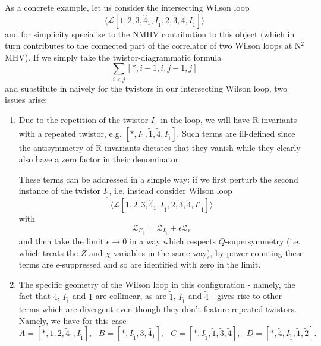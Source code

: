 \documentclass[12pt]{article}
\numberwithin{equation}{section}
\begin{document}
As a concrete example, let us consider the intersecting Wilson loop 
\begin{equation}
\langle \mathcal{L}[1,2,3,\widehat{4}_1,I_{\tilde{1}},\tilde{2},\tilde{3},\tilde{4},I_{\tilde{1}}] \rangle
\end{equation}
and for simplicity specialise to the NMHV contribution to this object (which in turn contributes to the connected part of the correlator of two Wilson loops at N\(^2\)MHV). If we simply take the twistor-diagrammatic formula 
\begin{equation}
\sum_{i<j} [*,i-1,i,j-1,j]
\end{equation}
and substitute in naively for the twistors in our intersecting Wilson loop, two issues arise: 
\begin{enumerate}
\item Due to the repetition of the twistor \(I_{\tilde{1}}\) in the loop, we will have R-invariants with a repeated twistor, e.g. \([*,I_{\tilde{1}},\tilde{1},\tilde{4},I_{\tilde{1}}]\). Such terms are ill-defined since the antisymmetry of R-invariants dictates that they vanish while they clearly also have a zero factor in their denominator.

These terms can be addressed in a simple way: if we first perturb the second instance of the twistor \(I_{\tilde{\jmath}}\), i.e. instead consider Wilson loop
\begin{equation}
\langle \mathcal{L}[1,2,3,\widehat{4}_1,I_{\tilde{1}},\tilde{2},\tilde{3},\tilde{4},I'_{\tilde{1}}] \rangle
\end{equation}
with
\begin{equation}
\mathcal{Z}_{I'_{\tilde{1}}} = \mathcal{Z}_{I_{\tilde{1}}} + \epsilon \mathcal{Z}_r
\end{equation}
and then take the limit \(\epsilon \to 0\) in a way which respects \(Q\)-supersymmetry (i.e. which treats the \(Z\) and \(\chi\) variables in the same way), by power-counting these terms are \(\epsilon\)-suppressed and so are identified with zero in the limit. 

\item The specific geometry of the Wilson loop in this configuration - namely, the fact that \(4\), \(I_{\tilde{1}}\) and \(1\) are collinear, as are \(\tilde{1}\), \(I_{\tilde{1}}\) and \(\tilde{4}\) - gives rise to other terms which are divergent even though they don't feature repeated twistors. Namely, we have for this case 
\begin{equation}
A = [*,1,2,\tilde{4}_1,I_{\tilde{1}}], \, \, \, \, B = [*,I_{\tilde{1}},3,\hat{4}_1], \, \, \, \ C = [*,I_{\tilde{1}},\tilde{1},\tilde{3},\tilde{4}], \, \, \, \, D = [*,\tilde{4},I_{\tilde{1}},\tilde{1},\tilde{2}].
\end{equation}


\end{enumerate}
\end{document}
